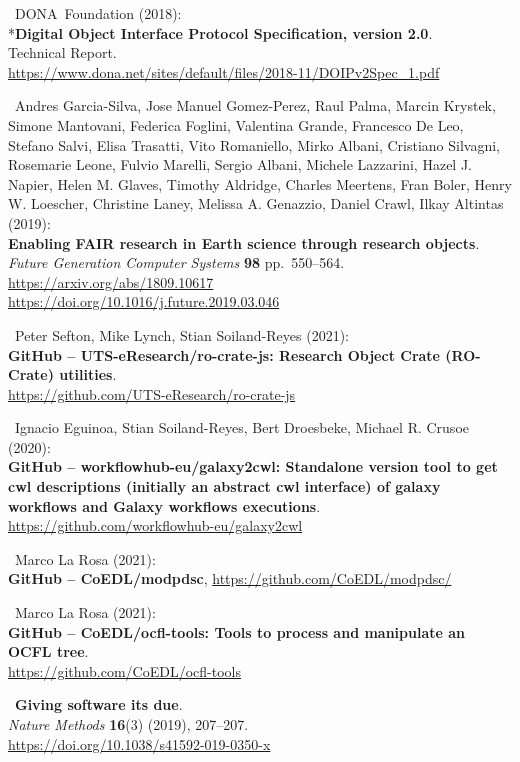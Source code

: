 \begin{thebibliography}{9}
~DONA~Foundation (2018):\\
*\textbf{Digital Object Interface Protocol Specification, version
2.0}.\\
Technical Report.\\
\url{https://www.dona.net/sites/default/files/2018-11/DOIPv2Spec_1.pdf}

~Andres Garcia-Silva, Jose Manuel Gomez-Perez, Raul Palma,
Marcin Krystek, Simone Mantovani, Federica Foglini, Valentina Grande,
Francesco De Leo, Stefano Salvi, Elisa Trasatti, Vito Romaniello, Mirko
Albani, Cristiano Silvagni, Rosemarie Leone, Fulvio Marelli, Sergio
Albani, Michele Lazzarini, Hazel J. Napier, Helen M. Glaves, Timothy
Aldridge, Charles Meertens, Fran Boler, Henry W. Loescher, Christine
Laney, Melissa A. Genazzio, Daniel Crawl, Ilkay Altintas (2019):\\
\textbf{Enabling FAIR research in Earth science through research
objects}.\\
\emph{Future Generation Computer Systems} \textbf{98} pp.~550--564.\\
\url{https://arxiv.org/abs/1809.10617}~\\
\url{https://doi.org/10.1016/j.future.2019.03.046}

~Peter Sefton, Mike Lynch, Stian Soiland-Reyes (2021):\\
\textbf{GitHub -- UTS-eResearch/ro-crate-js: Research Object Crate
(RO-Crate) utilities}.\\
\url{https://github.com/UTS-eResearch/ro-crate-js}

~Ignacio Eguinoa, Stian Soiland-Reyes, Bert Droesbeke, Michael
R. Crusoe (2020):\\
\textbf{GitHub -- workflowhub-eu/galaxy2cwl: Standalone version tool to
get cwl descriptions (initially an abstract cwl interface) of galaxy
workflows and Galaxy workflows executions}.\\
\url{https://github.com/workflowhub-eu/galaxy2cwl}

~Marco La Rosa (2021):\\
\textbf{GitHub -- CoEDL/modpdsc},
\url{https://github.com/CoEDL/modpdsc/}

~Marco La Rosa (2021):\\
\textbf{GitHub -- CoEDL/ocfl-tools: Tools to process and manipulate an
OCFL tree}.\\
\url{https://github.com/CoEDL/ocfl-tools}

~\textbf{Giving software its due}.\\
\emph{Nature Methods} \textbf{16}(3) (2019), 207--207.\\
\url{https://doi.org/10.1038/s41592-019-0350-x}


\end{thebibliography}
